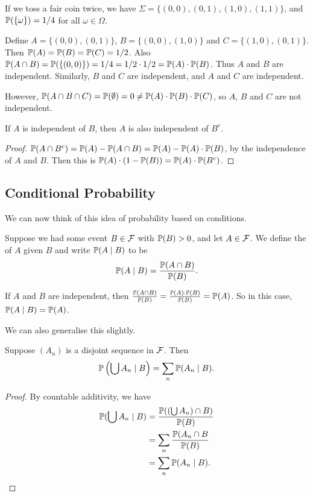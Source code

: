 \documentclass[a4paper]{scrreprt}
\begin{document}
\begin{example}
	If we toss a fair coin twice, we have $\Sigma = \{(0, 0), (0, 1), (1, 0), (1, 1)\}$, and $\mathbb{P}(\{\omega\}) = 1/4$ for all $\omega \in \Omega$.

Define $A = \{(0, 0), (0, 1)\}$, $B = \{(0, 0), (1,0)\}$ and $C = \{(1, 0), (0, 1)\}$. Then $\mathbb{P}(A) = \mathbb{P}(B) = \mathbb{P}(C) = 1/2$. Also $\mathbb{P}(A \cap B) = \mathbb{P}(\{(0, 0)\}) = 1/4 = 1/2 \cdot 1/2 = \mathbb{P}(A) \cdot \mathbb{P}(B)$. Thus $A$ and $B$ are independent. Similarly, $B$ and $C$ are independent, and $A$ and $C$ are independent.

However, $\mathbb{P}(A \cap B \cap C) = \mathbb{P}(\emptyset) = 0 \neq \mathbb{P}(A) \cdot \mathbb{P}(B) \cdot \mathbb{P}(C)$, so $A$, $B$ and $C$ are not independent. 
\end{example}

\begin{proposition}
	If $A$ is independent of $B$, then $A$ is also independent of $B^c$.
\end{proposition}
\begin{proof}
	$\mathbb{P}(A \cap B^c) = \mathbb{P}(A) - \mathbb{P}(A \cap B) = \mathbb{P}(A) - \mathbb{P}(A) \cdot \mathbb{P}(B)$, by the independence of $A$ and $B$. Then this is $\mathbb{P}(A)\cdot (1 - \mathbb{P}(B)) = \mathbb{P}(A) \cdot \mathbb{P}(B^c)$.
\end{proof}


\subsection{Conditional Probability}

We can now think of this idea of probability based on conditions.

\begin{definition}
	Suppose we had some event $B \in \mathcal{F}$ with $\mathbb{P}(B) > 0$, and let $A \in \mathcal{F}$. We define the  of $A$ given $B$
and write $\mathbb{P}(A \mid B)$ to be
$$
\mathbb{P}(A \mid B) = \frac{\mathbb{P}(A \cap B)}{\mathbb{P}(B)}.
$$
\end{definition}

If $A$ and $B$ are independent, then $\frac{\mathbb{P}(A \cap B)}{\mathbb{P}(B)} = \frac{\mathbb{P}(A) \cdot \mathbb{P}(B)}{\mathbb{P}(B)} = \mathbb{P}(A)$. So in this case, $\mathbb{P}(A \mid B) = \mathbb{P}(A)$.

We can also generalise this slightly.

\begin{proposition}
	Suppose $(A_n)$ is a disjoint sequence in $\mathcal{F}$. Then
$$
\mathbb{P}\left(\bigcup A_n \mid B\right) = \sum_n \mathbb{P}(A_n \mid B).
$$
\end{proposition}
\begin{proof}
	By countable additivity, we have
	\begin{align*}
		\mathbb{P}(\bigcup A_n \mid B) &= \frac{\mathbb{P}((\bigcup A_n) \cap B)}{\mathbb{P}(B)} \\
		&= \sum_n \frac{\mathbb{P}(A_n \cap B}{\mathbb{P}(B)}\\
		&= \sum_n \mathbb{P}(A_n \mid B).
	\end{align*}
\end{proof}
\end{document}
